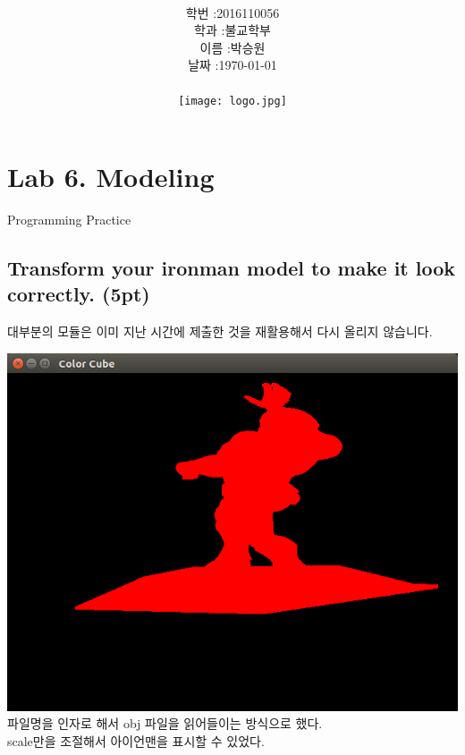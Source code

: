 \documentclass[12pt,a4paper]{article}
\title{
	\centering
	\pgfornament[width=12cm,color=teal]{84}\\
	\vspace{1cm}
	\fontsize{50}{50} \selectfont {컴퓨터 그래픽스 입문}\\
		\pgfornament[width=12cm,color=teal]{88}\\
	\vfill}
\author{
	\LARGE
	\begin{tabular}{rl}
		\hline
		학번 : & 2016110056\\ 
		학과 : & 불교학부 \\
		이름 : & 박승원\\
		날짜 : & \today\\
		\hline
	\end{tabular}\vspace{2cm}
	\\
\texttt{[image: logo.jpg]}
	}
\date{}
\begin{document}
\maketitle
{}
\noindent
\lstset{language=C++, columns=flexible, tabsize=4, frame=shadowbox, showstringspaces=false, breaklines=true, upquote=true, basicstyle=\normalsize}
\newpage
\section*{Lab 6. Modeling}

Programming Practice
\subsection{Transform your ironman model to make it look correctly. (5pt)}



대부분의 모듈은 이미 지난 시간에 제출한 것을 재활용해서 다시 올리지 않습니다.

\includegraphics[width=\textwidth]{3.png}
파일명을 인자로 해서 obj 파일을 읽어들이는 방식으로 했다.\\
scale만을 조절해서 아이언맨을 표시할 수 있었다.
\end{document}
